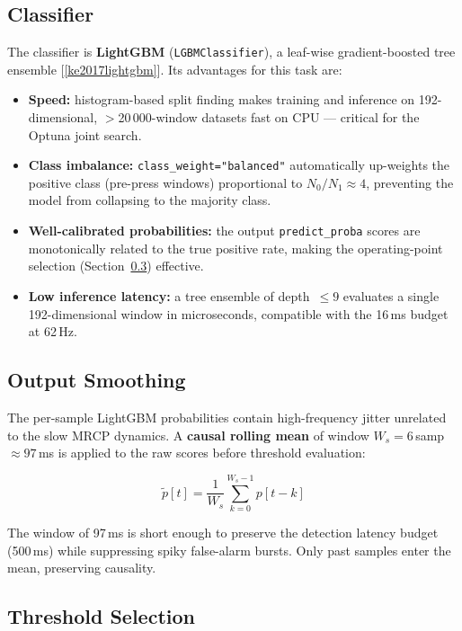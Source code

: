 \documentclass[12pt,a4paper]{article}
\begin{document}
\subsection{Classifier}

The classifier is \textbf{LightGBM} (\texttt{LGBMClassifier}), a
leaf-wise gradient-boosted tree ensemble [\ref{ke2017lightgbm}]. Its
advantages for this task are:

\begin{itemize}[leftmargin=1.5em]
  \item \textbf{Speed:} histogram-based split finding makes training and
        inference on 192-dimensional, $>$20\,000-window datasets fast on
        CPU — critical for the Optuna joint search.
  \item \textbf{Class imbalance:} \texttt{class\_weight="balanced"}
        automatically up-weights the positive class (pre-press windows)
        proportional to $N_0/N_1 \approx 4$, preventing the model from
        collapsing to the majority class.
  \item \textbf{Well-calibrated probabilities:} the output
        \texttt{predict\_proba} scores are monotonically related to the
        true positive rate, making the operating-point selection
        (Section~\ref{sec:threshold}) effective.
  \item \textbf{Low inference latency:} a tree ensemble of depth~$\leq 9$
        evaluates a single 192-dimensional window in microseconds,
        compatible with the 16\,ms budget at 62\,Hz.
\end{itemize}

\subsection{Output Smoothing}

The per-sample LightGBM probabilities contain high-frequency jitter
unrelated to the slow MRCP dynamics. A \textbf{causal rolling mean} of
window $W_s = 6$\,samp\,$\approx 97$\,ms is applied to the raw scores
before threshold evaluation:

\[
  \tilde{p}[t] = \frac{1}{W_s} \sum_{k=0}^{W_s-1} p[t-k]
\]

The window of 97\,ms is short enough to preserve the detection latency
budget (500\,ms) while suppressing spiky false-alarm bursts. Only past
samples enter the mean, preserving causality.

\subsection{Threshold Selection}
\label{sec:threshold}
\end{document}
